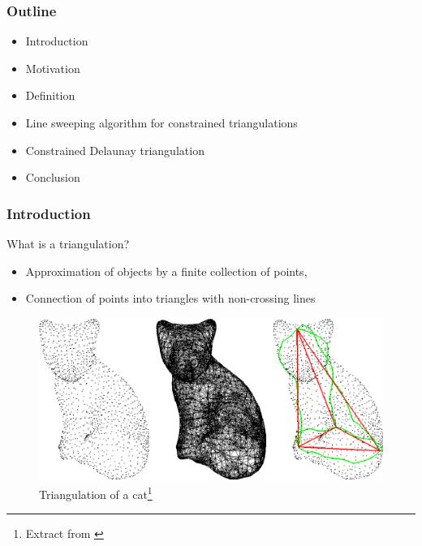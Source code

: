 \documentclass[10pt]{beamer}
\begin{document}
	\begin{frame}
		\frametitle{Outline}
		\begin{itemize}
			\item Introduction
			\item Motivation
			\item Definition
			\item Line sweeping algorithm for constrained triangulations
			\item Constrained Delaunay triangulation  
			\item Conclusion                        
		\end{itemize}
	\end{frame}
\begin{frame}
	\frametitle{Introduction} \begin{block}{What is a triangulation?}
		\begin{itemize}
			\item  Approximation of objects by a finite collection of points,
		\item Connection of points into triangles  with non-crossing lines \end{itemize} \end{block}
	\begin{figure}[H]
		\centering
		\includegraphics[width=0.5\linewidth]{triangulation}
		\caption[Triangulation of a cat]{Triangulation of a cat\footnote{Extract from \cite{hormann2002triangulating}}}
		\label{fig:triangulation}
	\end{figure}
	
	
\end{frame}
\end{document}
